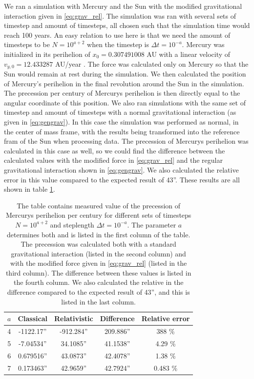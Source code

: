 \documentclass[reprint,english,notitlepage]{revtex4-1}  %
\begin{document}
We ran a simulation with Mercury and the Sun with the modified gravitational interaction given in \eqref{eq:grav_rel}. The simulation was ran with several sets of timestep and amount of timesteps, all chosen such that the simulation time would reach 100 years. An easy relation to use here is that we need the amount of timesteps to be $N = 10^{a+2}$ when the timestep is $\Delta t =  10^{-a}$. Mercury was initialized in its perihelion of \(x_{0}=0.307491008\) AU with a linear velocity of \(v_{y,0} = 12.433287\) AU/year \citep{NASASolarInit}. The force was calculated only on Mercury so that the Sun would remain at rest during the simulation. We then calculated the position of Mercury's perihelion in the final revolution around the Sun in the simulation. The precession per century of Mercurys perihelion is then directly equal to the angular coordinate of this position. We also ran simulations with the same set of timestep and amount of timesteps with a normal gravitational interaction (as given in \eqref{eq:gengrav}). In this case the simulation was performed as normal, in the center of mass frame, with the results being transformed into the reference fram of the Sun when processing data. The precession of Mercurys perihelion was calculated in this case as well, so we could find the difference between the calculated values with the modified force in \eqref{eq:grav_rel} and the regular gravitational interaction shown in \eqref{eq:gengrav}. We also calculated the relative error in this value compared to the expected result of 43''. These results are all shown in table \ref{table:precession}.


\begin{table}[H]
\caption{The table contains measured value of the precession of Mercurys perihelion per century for different sets of timesteps $N = 10^{a+2}$ and steplength $\Delta t = 10^{-a}$. The parameter $a$ determines both and is listed in the first column of the table. The precession was calculated both with a standard gravitational interaction (listed in the second column) and with the modified force given in \eqref{eq:grav_rel} (listed in the third column). The difference between these values is listed in the fourth column. We also calculated the relative in the difference compared to the expected result of 43'', and this is listed in the last column. }
\begin{tabular}{|c|c|c|c|c|}
\hline
$a$ & Classical & Relativistic & Difference & Relative error \\
\hline
4 & -1122.17'' & -912.284'' & 209.886'' & 388 \% \\
5 & -7.04534'' & 34.1085'' & 41.1538'' & 4.29 \% \\
6 & 0.679516'' & 43.0873'' & 42.4078'' & 1.38 \% \\
7 & 0.173463'' & 42.9659'' & 42.7924'' & 0.483 \% \\
\hline
\end{tabular}
\label{table:precession}
\end{table}
\end{document}
